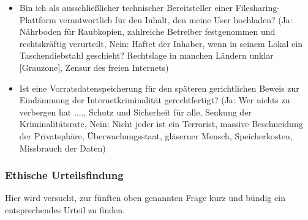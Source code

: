 \documentclass[letterpaper, 12pt]{article}
\let\tempsubsubsection\subsubsection
\renewcommand\subsubsection[1]{\vspace{0cm}\tempsubsubsection{#1}\vspace{0cm}}
\begin{document}
\begin{itemize}
	\item Bin ich als ausschließlicher technischer Bereitsteller einer Filesharing-Plattform
verantwortlich für den Inhalt, den meine User hochladen?
(Ja: Nährboden für Raubkopien, zahlreiche Betreiber festgenommen und rechtskräftig
verurteilt,
Nein: Haftet der Inhaber, wenn in seinem Lokal ein Taschendiebstahl geschieht? Rechtslage
in manchen Ländern unklar [Grauzone], Zensur des freien Internets)
	\item Ist eine Vorratsdatenspeicherung für den späteren gerichtlichen Beweis zur Eindämmung der
Internetkriminalität gerechtfertigt?
(Ja: Wer nichts zu verbergen hat ...., Schutz und Sicherheit für alle, Senkung der
Kriminalitätsrate,
Nein: Nicht jeder ist ein Terrorist, massive Beschneidung der Privatsphäre,
Überwachungsstaat, gläserner Mensch, Speicherkosten, Missbrauch der Daten)
\end{itemize}

\subsubsection{Ethische Urteilsfindung}

Hier wird versucht, zur fünften oben genannten Frage kurz und bündig ein entsprechendes Urteil zu finden.
\end{document}
